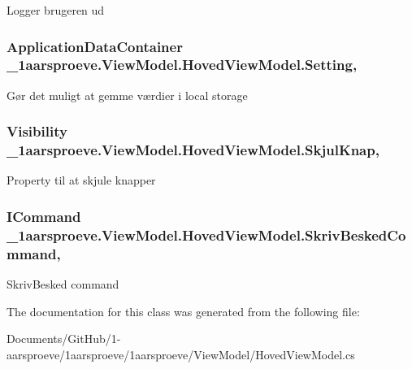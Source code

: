 Logger brugeren ud 

\hypertarget{class__1aarsproeve_1_1_view_model_1_1_hoved_view_model_afbb2eb2f33bdb6defe9979b80c6e79ff}{}
\subsubsection[{Setting}]{\setlength{\rightskip}{0pt plus 5cm}Application\+Data\+Container \+\_\+1aarsproeve.\+View\+Model.\+Hoved\+View\+Model.\+Setting\hspace{0.3cm}{\ttfamily [get]}, {\ttfamily [set]}}\label{class__1aarsproeve_1_1_view_model_1_1_hoved_view_model_afbb2eb2f33bdb6defe9979b80c6e79ff}


Gør det muligt at gemme værdier i local storage 

\hypertarget{class__1aarsproeve_1_1_view_model_1_1_hoved_view_model_ab292f28c3e469ad73d6d6e648f3096f0}{}
\subsubsection[{Skjul\+Knap}]{\setlength{\rightskip}{0pt plus 5cm}Visibility \+\_\+1aarsproeve.\+View\+Model.\+Hoved\+View\+Model.\+Skjul\+Knap\hspace{0.3cm}{\ttfamily [get]}, {\ttfamily [set]}}\label{class__1aarsproeve_1_1_view_model_1_1_hoved_view_model_ab292f28c3e469ad73d6d6e648f3096f0}


Property til at skjule knapper 

\hypertarget{class__1aarsproeve_1_1_view_model_1_1_hoved_view_model_a72688ca49a29be5fc3fa18d16449387e}{}
\subsubsection[{Skriv\+Besked\+Command}]{\setlength{\rightskip}{0pt plus 5cm}I\+Command \+\_\+1aarsproeve.\+View\+Model.\+Hoved\+View\+Model.\+Skriv\+Besked\+Command\hspace{0.3cm}{\ttfamily [get]}, {\ttfamily [set]}}\label{class__1aarsproeve_1_1_view_model_1_1_hoved_view_model_a72688ca49a29be5fc3fa18d16449387e}


Skriv\+Besked command 



The documentation for this class was generated from the following file\+:\begin{DoxyCompactItemize}
\item 
Documents/\+Git\+Hub/1-\/aarsproeve/1aarsproeve/1aarsproeve/\+View\+Model/Hoved\+View\+Model.\+cs\end{DoxyCompactItemize}
